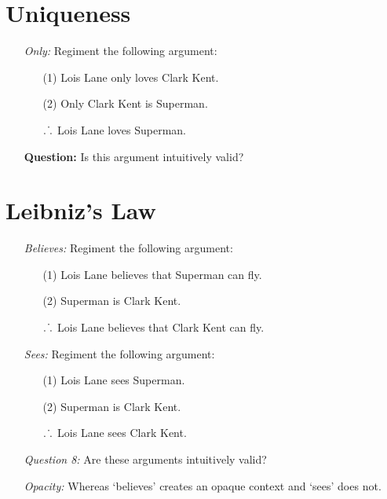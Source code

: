 \documentclass[a4paper, 11pt]{article} %
\def\therefore{\ensuremath{\ldotp\dot\,\ldotp}}
\begin{document}
\section*{Uniqueness}

\begin{enumerate}
  \item[\it Only:] Regiment the following argument:
    \begin{itemize}
      \item[(1)] Lois Lane only loves Clark Kent.
      \item[(2)] Only Clark Kent is Superman.
      \item[$\therefore$] Lois Lane loves Superman.
    \end{itemize}
  \item[\bf Question:] Is this argument intuitively valid?
\end{enumerate}






\section*{Leibniz's Law}

\begin{enumerate}
  \item[\it Believes:] Regiment the following argument:
    \begin{itemize}
      \item[(1)] Lois Lane believes that Superman can fly.
      \item[(2)] Superman is Clark Kent.
      \item[$\therefore$] Lois Lane believes that Clark Kent can fly.
    \end{itemize}
  \item[\it Sees:] Regiment the following argument:
    \begin{itemize}
      \item[(1)] Lois Lane sees Superman.
      \item[(2)] Superman is Clark Kent.
      \item[$\therefore$] Lois Lane sees Clark Kent.
    \end{itemize}
  \item[\it Question 8:] Are these arguments intuitively valid?
  \item[\it Opacity:] Whereas `believes' creates an opaque context and `sees' does not.
\end{enumerate}
\end{document}
